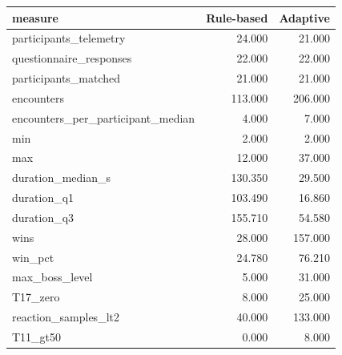 \documentclass[10pt]{article}
\begin{document}
{\scriptsize\setlength{\tabcolsep}{3pt}\begin{longtable}{lrr}
\toprule
measure & Rule-based & Adaptive \\
\midrule
\endhead
participants\_telemetry & 24.000 & 21.000 \\
questionnaire\_responses & 22.000 & 22.000 \\
participants\_matched & 21.000 & 21.000 \\
encounters & 113.000 & 206.000 \\
encounters\_per\_participant\_median & 4.000 & 7.000 \\
min & 2.000 & 2.000 \\
max & 12.000 & 37.000 \\
duration\_median\_s & 130.350 & 29.500 \\
duration\_q1 & 103.490 & 16.860 \\
duration\_q3 & 155.710 & 54.580 \\
wins & 28.000 & 157.000 \\
win\_pct & 24.780 & 76.210 \\
max\_boss\_level & 5.000 & 31.000 \\
T17\_zero & 8.000 & 25.000 \\
reaction\_samples\_lt2 & 40.000 & 133.000 \\
T11\_gt50 & 0.000 & 8.000 \\
\bottomrule
\end{longtable}}
\end{document}
